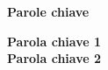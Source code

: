 \clearemptydoublepage{}
\thispagestyle{empty}
\vspace*{20ex}
\begin{flushright}
    \begin{LARGE}
        \textbf{Parole chiave}\\
        \vspace{5ex}
    \end{LARGE}
    \begin{normalsize}
        \textbf{%
            Parola chiave 1\\%
            \medskip
            Parola chiave 2%
        }
    \end{normalsize}
\end{flushright}
\vfill
